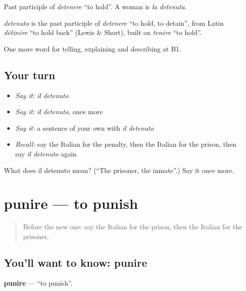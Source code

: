 Past participle of \emph{detenere} \textquotedblleft{}to hold\textquotedblright{}. A woman is \emph{la detenuta}.

\begin{cousinweb}
\emph{detenuto} is the past participle of \emph{detenere} \textquotedblleft{}to hold, to detain\textquotedblright{}, from Latin \emph{dētinēre} \textquotedblleft{}to hold back\textquotedblright{} (Lewis \& Short), built on \emph{tenēre} \textquotedblleft{}to hold\textquotedblright{}.
\end{cousinweb}

\begin{grammarlens}[title={What you've built}]
One more word for telling, explaining and describing at B1.
\end{grammarlens}

\subsection*{Your turn}
\begin{itemize}
\raggedright
  \item \emph{Say it:} \emph{il detenuto}
  \item \emph{Say it:} \emph{il detenuto}, once more
  \item \emph{Say it:} a sentence of your own with \emph{il detenuto}
  \item \emph{Recall:} say the Italian for the penalty, then the Italian for the prison, then say \emph{il detenuto} again
\end{itemize}

\begin{tcolorbox}[breakable,colback=teal!4,colframe=teal!35!black,title={Before you move on}]
What does il detenuto mean? (\textquotedblleft{}The prisoner, the inmate\textquotedblright{}.) Say it once more.
\end{tcolorbox}
\section[punire]{punire — to punish}

\label{lesson:IT-C393-punire}



\begin{quote}
Before the new one: say the Italian for the prison, then the Italian for the prisoner.
\end{quote}

\subsection*{You'll want to know: punire}
\textbf{punire} — \textquotedblleft{}to punish\textquotedblright{}.


